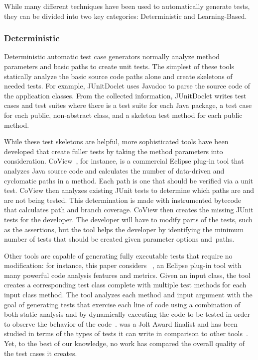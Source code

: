 While many different techniques have been used to automatically generate tests, they can be divided into two key categories: Deterministic and Learning-Based.

\subsubsection{Deterministic}

Deterministic automatic test case generators normally analyze method parameters and basic paths to create unit tests.  The simplest of these tools statically analyze the basic source code paths alone and create skeletons of  needed tests.  For example, JUnitDoclet \cite{JUnitDoclet} uses Javadoc to parse the source code of the application classes. From the collected information, JUnitDoclet writes test cases and test suites where there is a test suite for each Java package, a test case for each public, non-abstract class, and a skeleton test method for each public method. %


While these test skeletons are helpful, more sophisticated tools have been developed that create fuller tests by taking the method parameters into consideration. CoView~\cite{CoView}, for instance, is a commercial Eclipse plug-in tool that analyzes Java source code and calculates the number of data-driven and cyclomatic paths in a method. Each path is one that should be verified via a unit test. CoView then analyzes existing JUnit tests to determine which paths are and are not being tested. This determination is made with instrumented bytecode that calculates path and branch coverage. CoView then creates the missing JUnit tests for the developer. The developer will have to modify parts of the tests, such as the assertions, but the tool helps the developer by identifying the minimum number of tests that should be created given parameter options \mbox{and paths}.

Other tools are capable of generating fully executable tests that require no modification: for instance, this paper considers \codepro~\cite{CodePro1}, an Eclipse plug-in tool with many powerful code analysis features and metrics.  Given an input class, the tool creates a corresponding test class complete with multiple test methods for each input class method. The tool analyzes each method and input argument with the goal of generating tests that exercise each line of code using a combination of both static analysis and by dynamically executing the code to be tested in order to observe the behavior of the code~\cite{CodePro2}.  \codepro was a Jolt Award finalist and has been studied in terms of the types of tests it can write in comparison to other tools~\cite{xie2009}.  Yet, to the best of our knowledge, no work has compared the overall quality of the test cases it creates.

